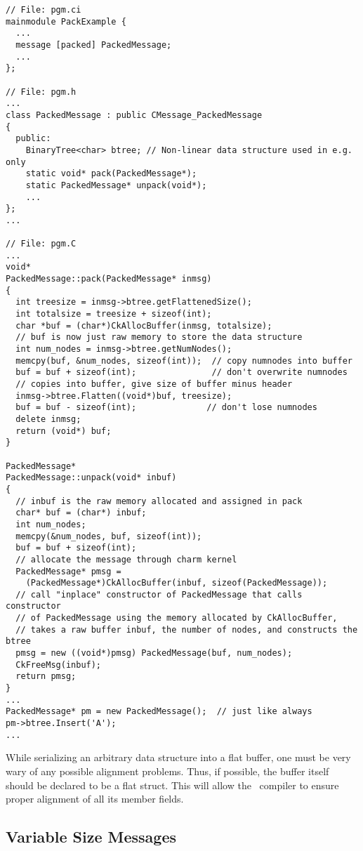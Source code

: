 \begin{verbatim}
// File: pgm.ci
mainmodule PackExample {
  ...
  message [packed] PackedMessage;
  ...
};

// File: pgm.h
...
class PackedMessage : public CMessage_PackedMessage
{
  public:
    BinaryTree<char> btree; // Non-linear data structure used in e.g. only 
    static void* pack(PackedMessage*);
    static PackedMessage* unpack(void*);
    ...
};
...

// File: pgm.C
...
void*
PackedMessage::pack(PackedMessage* inmsg)
{
  int treesize = inmsg->btree.getFlattenedSize();
  int totalsize = treesize + sizeof(int);
  char *buf = (char*)CkAllocBuffer(inmsg, totalsize);
  // buf is now just raw memory to store the data structure
  int num_nodes = inmsg->btree.getNumNodes();
  memcpy(buf, &num_nodes, sizeof(int));  // copy numnodes into buffer
  buf = buf + sizeof(int);               // don't overwrite numnodes
  // copies into buffer, give size of buffer minus header
  inmsg->btree.Flatten((void*)buf, treesize);    
  buf = buf - sizeof(int);              // don't lose numnodes
  delete inmsg;
  return (void*) buf;
}

PackedMessage*
PackedMessage::unpack(void* inbuf)
{
  // inbuf is the raw memory allocated and assigned in pack
  char* buf = (char*) inbuf;
  int num_nodes;
  memcpy(&num_nodes, buf, sizeof(int));
  buf = buf + sizeof(int);
  // allocate the message through charm kernel
  PackedMessage* pmsg = 
    (PackedMessage*)CkAllocBuffer(inbuf, sizeof(PackedMessage));
  // call "inplace" constructor of PackedMessage that calls constructor
  // of PackedMessage using the memory allocated by CkAllocBuffer,
  // takes a raw buffer inbuf, the number of nodes, and constructs the btree
  pmsg = new ((void*)pmsg) PackedMessage(buf, num_nodes);  
  CkFreeMsg(inbuf);
  return pmsg;
}
... 
PackedMessage* pm = new PackedMessage();  // just like always 
pm->btree.Insert('A');
...
\end{verbatim}


While serializing an arbitrary data structure into a flat buffer, one
must be very wary of any possible alignment problems.  Thus, if
possible, the buffer itself should be declared to be a flat struct.
This will allow the \CC\ compiler to ensure proper alignment of all
its member fields.


\subsection{Variable Size Messages}
\label{varsize messages}

